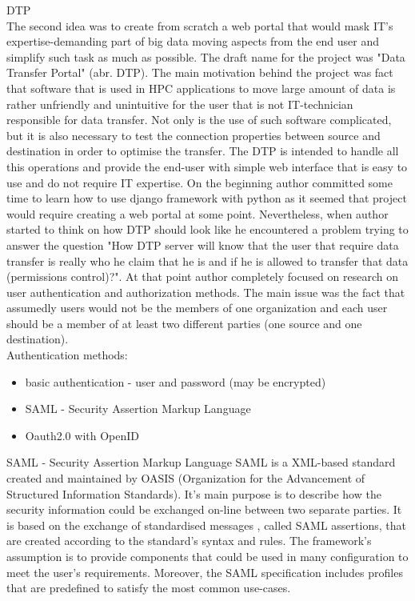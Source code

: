 \documentclass[magisterska,en]{pracamgr}
\begin{document}
\newpage
DTP\\
The second idea was to create from scratch a web portal that would mask IT's expertise-demanding part of big data moving aspects from the end user and simplify such task as much as possible. The draft name for the project was "Data Transfer Portal" (abr. DTP). The main motivation behind the project was fact that software that is used in HPC applications to move large amount of data is rather unfriendly and unintuitive for the user that is not IT-technician responsible for data transfer. Not only is the use of such software complicated, but it is also necessary to test the connection properties between source and destination in order to optimise the transfer. The DTP is intended to handle all this operations and provide the end-user with simple web interface that is easy to use and do not require IT expertise.
On the beginning author committed some time to learn how to use django framework with python \cite{djangotutorial} as it seemed that project would require creating a web portal at some point. 
Nevertheless, when author started to think on how DTP should look like he encountered a problem trying to answer the question "How DTP server will know that the user that require data transfer is really who he claim that he is and if he is allowed to transfer that data (permissions control)?". At that point author completely focused on research on user authentication and authorization methods. The main issue was the fact that assumedly users would not be the members of one organization and each user should be a member of at least two different parties (one source and one destination).\\

Authentication methods:\cite{auth_meth}

\begin{itemize}
 \item basic authentication - user and password (may be encrypted)
 \item SAML - Security Assertion Markup Language\cite{saml2}
 \item Oauth2.0\cite{OAuth2} with OpenID\cite{OpenID}
\end{itemize}


SAML - Security Assertion Markup Language
SAML is a XML-based standard created and maintained by OASIS (Organization for the Advancement of Structured Information Standards). It's main purpose is to describe how the security information could be exchanged on-line between two separate parties. It is based on the exchange of standardised messages , called SAML assertions, that are created according to the standard's syntax and rules. The framework's assumption is to provide components that could be used in many configuration to meet the user's requirements. Moreover, the SAML specification includes profiles that are predefined to satisfy the most common use-cases.\cite{saml2}\\
\end{document}
